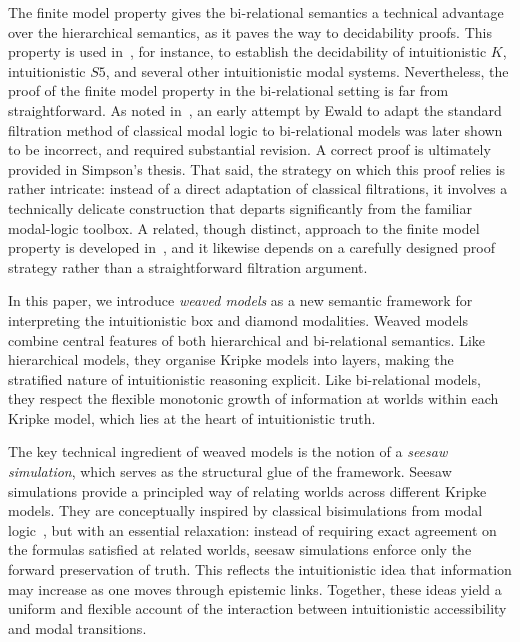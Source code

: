 The finite model property gives the bi-relational semantics a technical advantage over the hierarchical semantics, as it paves the way to decidability proofs. This property is used in~\cite{simpson1994}, for instance, to establish the decidability of intuitionistic $K$, intuitionistic $S5$, and several other intuitionistic modal systems.
Nevertheless, the proof of the finite model property in the bi-relational setting is far from straightforward. As noted in~\cite{simpson1994}, an early attempt by Ewald to adapt the standard filtration method of classical modal logic to bi-relational models was later shown to be incorrect, and required substantial revision. A correct proof is ultimately provided in Simpson's thesis. That said, the strategy on which this proof relies is rather intricate: instead of a direct adaptation of classical filtrations, it involves a technically delicate construction that departs significantly from the familiar modal-logic toolbox. A related, though distinct, approach to the finite model property is developed in~\cite{gabbay2003many}, and it likewise depends on a carefully designed proof strategy rather than a straightforward filtration argument.

In this paper, we introduce \emph{weaved models} as a new semantic framework for interpreting the intuitionistic box and diamond modalities. Weaved models combine central features of both hierarchical and bi-relational semantics. Like hierarchical models, they organise Kripke models into layers, making the stratified nature of intuitionistic reasoning explicit. Like bi-relational models, they respect the flexible monotonic growth of information at worlds within each Kripke model, which lies at the heart of intuitionistic truth.

The key technical ingredient of weaved models is the notion of a \emph{seesaw simulation}, which serves as the structural glue of the framework. Seesaw simulations provide a principled way of relating worlds across different Kripke models. They are conceptually inspired by classical bisimulations from modal logic~\cite{blac:hand06}, but with an essential relaxation: instead of requiring exact agreement on the formulas satisfied at related worlds, seesaw simulations enforce only the forward preservation of truth. This reflects the intuitionistic idea that information may increase as one moves through epistemic links. Together, these ideas yield a uniform and flexible account of the interaction between intuitionistic accessibility and modal transitions.

